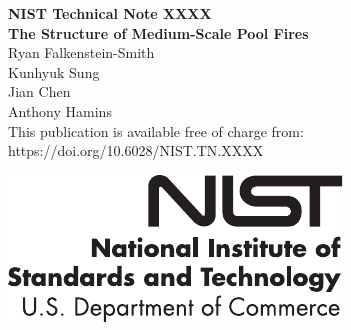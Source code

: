 \documentclass[12pt]{article}
\newcommand{\pubnumber}{XXXX}
\newcommand{\DOI}{https://doi.org/10.6028/NIST.TN.XXXX}
\begin{document}
	
	\begin{titlepage}
		\begin{flushright}
\LARGE{\textbf{NIST Technical Note \pubnumber}}\\
\vfill
\Huge{\textbf{The Structure of Medium-Scale Pool Fires}}\\
\vfill
\large Ryan Falkenstein-Smith\\
\large Kunhyuk Sung\\
\large Jian Chen\\
\large Anthony Hamins\\
\vfill
\normalsize This publication is available free of charge from:\\
\DOI\\
\vfill

\includegraphics[width=0.3\linewidth]{NIST-logo}\\


\end{flushright}
\end{titlepage}
\end{document}
